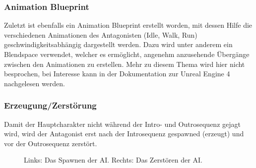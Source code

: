 \subsubsection{Animation Blueprint}
Zuletzt ist ebenfalls ein Animation Blueprint erstellt worden, mit dessen Hilfe die verschiedenen Animationen des Antagonisten (Idle, Walk, Run) geschwindigkeitsabhängig dargestellt werden. Dazu wird unter anderem ein Blendspace verwendet, welcher es ermöglicht, angenehm anzusehende Übergänge zwischen den Animationen zu erstellen. Mehr zu diesem Thema wird hier nicht besprochen, bei Interesse kann in der Dokumentation zur Unreal Engine 4 nachgelesen werden.
\subsubsection{Erzeugung/Zerstörung}
Damit der Hauptcharakter nicht während der Intro- und Outrosequenz gejagt wird, wird der Antagonist erst nach der Introsequenz gespawned (erzeugt) und vor der Outrosequenz zerstört.
\begin{figure}[H]
    \caption{Links: Das Spawnen der AI. Rechts: Das Zerstören der AI.}
    \label{UE:AI_Spawn_Kill}
\end{figure}

